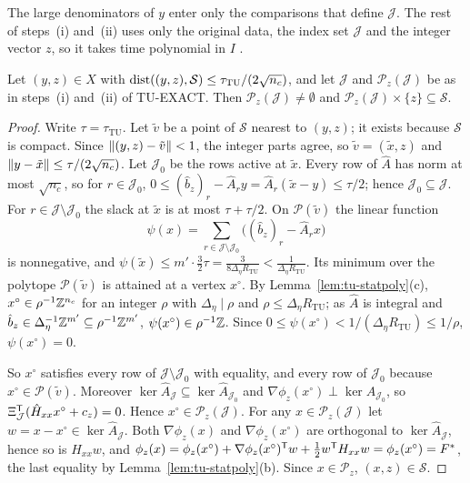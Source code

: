 The large denominators of $y$ enter only the comparisons that define
$\mathcal J$. The rest of steps~(i) and~(ii) uses only the original data,
the index set $\mathcal J$ and the integer vector $z$, so it takes time
polynomial in $I$ \cite[Theorem~6.4.12]{GrotschelLovaszSchrijver1988}.

\begin{lemma}\label{lem:tu-snap}
Let $(y,z)\in X$ with $\operatorname{dist}((y,z),\mathcal S)\le\tau_{\mathrm{TU}}/(2\sqrt{n_c})$,
and let $\mathcal J$ and $\mathcal P_z(\mathcal J)$ be as in steps~(i)
and~(ii) of TU-EXACT. Then $\mathcal P_z(\mathcal J)\ne\emptyset$ and
$\mathcal P_z(\mathcal J)\times\{z\}\subseteq\mathcal S$.
\end{lemma}

\begin{proof}
Write $\tau=\tau_{\mathrm{TU}}$. Let $\tilde v$ be a point of $\mathcal S$
nearest to $(y,z)$; it exists because $\mathcal S$ is compact. Since
$\lVert (y,z)-\tilde v\rVert<1$, the integer parts agree, so $\tilde v=(\tilde x,z)$
and $\lVert y-\tilde x\rVert\le\tau/(2\sqrt{n_c})$. Let $\mathcal J_0$ be the rows
active at $\tilde x$. Every row of $\hat A$ has norm at most $\sqrt{n_c}$, so
for $r\in\mathcal J_0$,
$0\le(\hat b_z)_r-\hat A_ry=\hat A_r(\tilde x-y)\le\tau/2$; hence
$\mathcal J_0\subseteq\mathcal J$. For $r\in\mathcal J\setminus\mathcal J_0$ the
slack at $\tilde x$ is at most $\tau+\tau/2$. On $\mathcal P(\tilde v)$ the
linear function
\[
\psi(x)=\sum_{r\in\mathcal J\setminus\mathcal J_0}\bigl((\hat b_z)_r-\hat A_rx\bigr)
\]
is nonnegative, and
$\psi(\tilde x)\le m'\cdot\frac32\tau=\frac3{8\Delta_\eta R_{\mathrm{TU}}}
<\frac1{\Delta_\eta R_{\mathrm{TU}}}$. Its minimum over the polytope
$\mathcal P(\tilde v)$ is attained at a vertex $x^\circ$. By
Lemma~\ref{lem:tu-statpoly}(c), $x^\circ\in\rho^{-1}\mathbb Z^{n_c}$ for an integer
$\rho$ with $\Delta_\eta\mid\rho$ and $\rho\le\Delta_\eta R_{\mathrm{TU}}$; as
$\hat A$ is integral and
$\hat b_z\in\Delta_\eta^{-1}\mathbb Z^{m'}\subseteq\rho^{-1}\mathbb Z^{m'}$,
$\psi(x^\circ)\in\rho^{-1}\mathbb Z$. Since
$0\le\psi(x^\circ)<1/(\Delta_\eta R_{\mathrm{TU}})\le1/\rho$,
$\psi(x^\circ)=0$.

So $x^\circ$ satisfies every row of $\mathcal J\setminus\mathcal J_0$ with
equality, and every row of $\mathcal J_0$ because $x^\circ\in\mathcal P(\tilde v)$.
Moreover $\ker\hat A_{\mathcal J}\subseteq\ker\hat A_{\mathcal J_0}$ and
$\nabla\phi_z(x^\circ)\perp\ker\hat A_{\mathcal J_0}$, so
$\Xi_{\mathcal J}^{\mathsf T}(\hat H_{xx}x^\circ+c_z)=0$. Hence
$x^\circ\in\mathcal P_z(\mathcal J)$. For any $x\in\mathcal P_z(\mathcal J)$ let
$w=x-x^\circ\in\ker\hat A_{\mathcal J}$. Both $\nabla\phi_z(x)$ and
$\nabla\phi_z(x^\circ)$ are orthogonal to $\ker\hat A_{\mathcal J}$, hence so is
$H_{xx}w$, and
$\phi_z(x)=\phi_z(x^\circ)+\nabla\phi_z(x^\circ)^{\mathsf T}w+\frac12w^{\mathsf T}H_{xx}w=\phi_z(x^\circ)=F^{*}$,
the last equality by Lemma~\ref{lem:tu-statpoly}(b). Since
$x\in\mathcal P_z$, $(x,z)\in\mathcal S$.
\end{proof}

